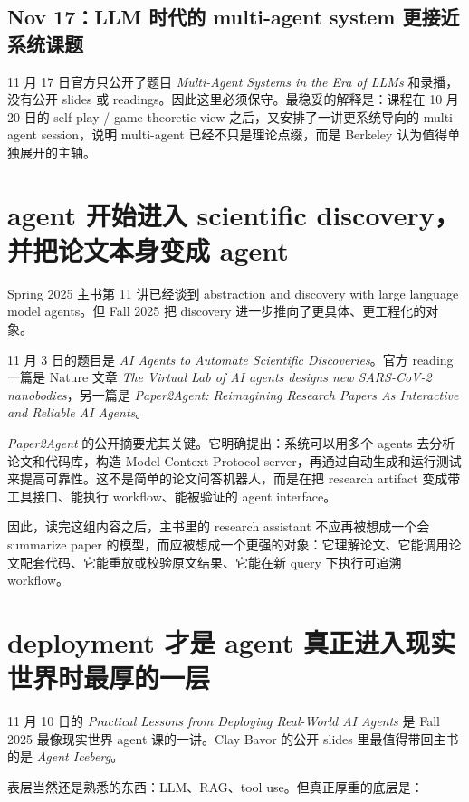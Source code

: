 \documentclass[11pt]{ctexbook}
\begin{document}
\subsection{Nov 17：LLM 时代的 multi-agent system 更接近系统课题}

11 月 17 日官方只公开了题目 \emph{Multi-Agent Systems in the Era of LLMs} 和录播，没有公开 slides 或 readings。因此这里必须保守。最稳妥的解释是：课程在 10 月 20 日的 self-play / game-theoretic view 之后，又安排了一讲更系统导向的 multi-agent session，说明 multi-agent 已经不只是理论点缀，而是 Berkeley 认为值得单独展开的主轴。

\section{agent 开始进入 scientific discovery，并把论文本身变成 agent}

Spring 2025 主书第 11 讲已经谈到 abstraction and discovery with large language model agents。但 Fall 2025 把 discovery 进一步推向了更具体、更工程化的对象。

11 月 3 日的题目是 \emph{AI Agents to Automate Scientific Discoveries}。官方 reading 一篇是 Nature 文章 \emph{The Virtual Lab of AI agents designs new SARS-CoV-2 nanobodies}，另一篇是 \emph{Paper2Agent: Reimagining Research Papers As Interactive and Reliable AI Agents}。

\emph{Paper2Agent} 的公开摘要尤其关键。它明确提出：系统可以用多个 agents 去分析论文和代码库，构造 Model Context Protocol server，再通过自动生成和运行测试来提高可靠性。这不是简单的论文问答机器人，而是在把 research artifact 变成带工具接口、能执行 workflow、能被验证的 agent interface。

因此，读完这组内容之后，主书里的 research assistant 不应再被想成一个会 summarize paper 的模型，而应被想成一个更强的对象：它理解论文、它能调用论文配套代码、它能重放或校验原文结果、它能在新 query 下执行可追溯 workflow。

\section{deployment 才是 agent 真正进入现实世界时最厚的一层}

11 月 10 日的 \emph{Practical Lessons from Deploying Real-World AI Agents} 是 Fall 2025 最像现实世界 agent 课的一讲。Clay Bavor 的公开 slides 里最值得带回主书的是 \emph{Agent Iceberg}。

表层当然还是熟悉的东西：LLM、RAG、tool use。但真正厚重的底层是：
\end{document}
